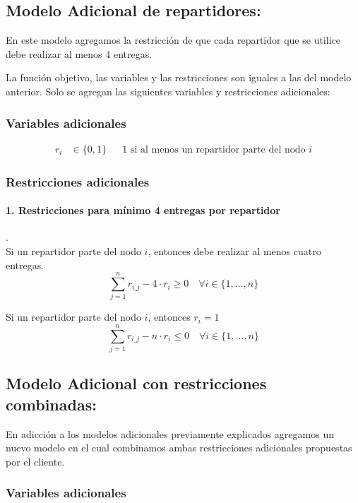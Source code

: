\documentclass{article}
\begin{document}
    \subsection{Modelo Adicional de repartidores:} \label{modelo1}

    En este modelo agregamos la restricción de que cada repartidor que se utilice debe realizar al menos 4 entregas.

    La función objetivo, las variables y las restricciones son iguales a las del modelo anterior. Solo se agregan las siguientes variables y restricciones adicionales:

    \subsubsection*{Variables adicionales}

    \begin{align*}
        r_{i} &\in \{0,1\} && \text{1 si al menos un repartidor parte del nodo } i
    \end{align*}

    \subsubsection*{Restricciones adicionales}

    \paragraph{1. Restricciones para mínimo 4 entregas por repartidor}.  \\

    Si un repartidor parte del nodo $i$, entonces debe realizar al menos cuatro entregas.
    \[
    \sum_{j=1}^{n} r_{i\_j} - 4 \cdot r_{i} \geq 0 \quad \forall i \in \{1, \dots, n\}
    \]

    Si un repartidor parte del nodo $i$, entonces $r_i = 1$
    \[
    \sum_{j=1}^{n} r_{i\_j} - n \cdot r_{i} \leq 0 \quad \forall i \in \{1, \dots, n\}
    \]


    \subsection{Modelo Adicional con restricciones combinadas:} \label{modelo1}
    En adicción a los modelos adicionales previamente explicados agregamos un nuevo modelo en el cual combinamos ambas restricciones adicionales propuestas por el cliente.
    \subsubsection*{Variables adicionales}
\end{document}
